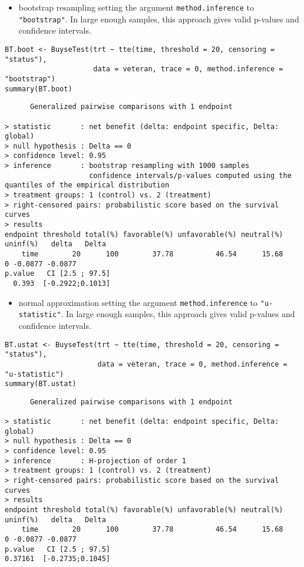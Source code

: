 \documentclass[12pt]{article}
\begin{document}
\begin{itemize}
\item bootstrap resampling setting the argument \texttt{method.inference} to
\texttt{"bootstrap"}. In large enough samples, this approach gives valid
p-values and confidence intervals.
\end{itemize}

\lstset{language=r,label= ,caption= ,captionpos=b,numbers=none}
\begin{lstlisting}
BT.boot <- BuyseTest(trt ~ tte(time, threshold = 20, censoring = "status"),
					 data = veteran, trace = 0, method.inference = "bootstrap") 
summary(BT.boot)
\end{lstlisting}

\begin{verbatim}
      Generalized pairwise comparisons with 1 endpoint

> statistic       : net benefit (delta: endpoint specific, Delta: global) 
> null hypothesis : Delta == 0 
> confidence level: 0.95 
> inference       : bootstrap resampling with 1000 samples 
                    confidence intervals/p-values computed using the quantiles of the empirical distribution 
> treatment groups: 1 (control) vs. 2 (treatment) 
> right-censored pairs: probabilistic score based on the survival curves
> results
endpoint threshold total(%) favorable(%) unfavorable(%) neutral(%) uninf(%)   delta   Delta
    time        20      100        37.78          46.54      15.68        0 -0.0877 -0.0877
p.value   CI [2.5 ; 97.5]
  0.393  [-0.2922;0.1013]
\end{verbatim}

\begin{itemize}
\item normal approximation setting the argument \texttt{method.inference} to
\texttt{"u-statistic"}. In large enough samples, this approach gives valid
p-values and confidence intervals.
\end{itemize}

\lstset{language=r,label= ,caption= ,captionpos=b,numbers=none}
\begin{lstlisting}
BT.ustat <- BuyseTest(trt ~ tte(time, threshold = 20, censoring = "status"),
					  data = veteran, trace = 0, method.inference = "u-statistic") 
summary(BT.ustat)
\end{lstlisting}

\begin{verbatim}
      Generalized pairwise comparisons with 1 endpoint

> statistic       : net benefit (delta: endpoint specific, Delta: global) 
> null hypothesis : Delta == 0 
> confidence level: 0.95 
> inference       : H-projection of order 1
> treatment groups: 1 (control) vs. 2 (treatment) 
> right-censored pairs: probabilistic score based on the survival curves
> results
endpoint threshold total(%) favorable(%) unfavorable(%) neutral(%) uninf(%)   delta   Delta
    time        20      100        37.78          46.54      15.68        0 -0.0877 -0.0877
p.value   CI [2.5 ; 97.5]
0.37161  [-0.2735;0.1045]
\end{verbatim}
\end{document}
